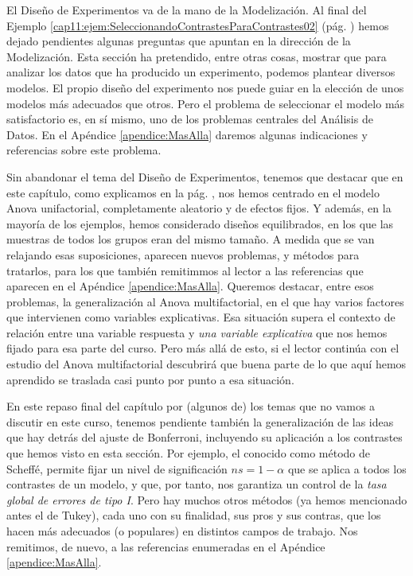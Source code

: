El Diseño de Experimentos va de la mano de la Modelización. Al final del Ejemplo \ref{cap11:ejem:SeleccionandoContrastesParaContrastes02} (pág. \pageref{cap11:ejem:SeleccionandoContrastesParaContrastes02}) hemos dejado pendientes algunas preguntas que apuntan en la dirección de la Modelización. Esta sección ha pretendido, entre otras cosas, mostrar que para analizar los datos que ha producido un experimento, podemos plantear diversos modelos. El propio diseño del experimento nos puede guiar en la elección de unos modelos más adecuados que otros. Pero el problema de seleccionar el modelo más satisfactorio es, en sí mismo, uno de los problemas centrales del Análisis de Datos. En el Apéndice \ref{apendice:MasAlla} daremos algunas indicaciones y referencias sobre este problema.

Sin abandonar el tema del Diseño de Experimentos, tenemos que destacar que en este capítulo, como explicamos en la pág. \pageref{cap11:subsubsec:AnovaUnifactorialCompletamenteAleatorioEfectosFijos}, nos hemos centrado en el modelo Anova unifactorial, completamente aleatorio y de efectos fijos. Y además, en la mayoría de los ejemplos, hemos considerado diseños equilibrados, en los que las muestras de todos los grupos eran del mismo tamaño. A medida que se van relajando  esas suposiciones, aparecen nuevos problemas, y métodos para tratarlos, para los que también remitimmos al lector a las referencias que aparecen en el Apéndice \ref{apendice:MasAlla}. Queremos destacar, entre esos problemas, la generalización al Anova multifactorial, en el que hay varios factores que intervienen como variables explicativas. Esa situación supera el contexto de relación entre una variable respuesta y {\em una variable explicativa} que nos hemos fijado para esa parte del curso. Pero más allá de esto, si el lector continúa con el estudio del Anova multifactorial descubrirá que buena parte de lo que aquí hemos aprendido se traslada casi punto por punto a esa situación.

En este repaso final del capítulo por (algunos de) los temas que no vamos a discutir en este curso, tenemos pendiente también la generalización de las ideas que hay detrás del ajuste de Bonferroni, incluyendo su aplicación  a los contrastes que hemos visto en esta sección. Por ejemplo, el conocido como {\sf método de Scheffé}, permite fijar un nivel de significación $ns=1-\alpha$ que se aplica a todos los contrastes de un modelo, y que, por tanto, nos garantiza un control de la {\em tasa global de errores de tipo I}.  Pero hay muchos otros métodos (ya hemos mencionado antes el de Tukey),  cada uno con su finalidad, sus pros y sus contras, que los hacen más adecuados (o populares) en distintos campos de trabajo. Nos remitimos, de nuevo, a las referencias enumeradas en el Apéndice \ref{apendice:MasAlla}.
